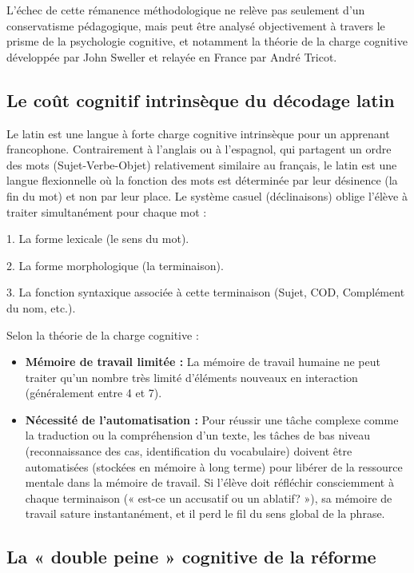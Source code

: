 L'échec de cette rémanence méthodologique ne relève pas seulement d'un conservatisme pédagogique,
mais peut être analysé objectivement à travers le prisme de la psychologie cognitive, et notamment
la théorie de la charge cognitive développée par John Sweller et relayée en France par André
Tricot.\cite{I-3-2-ref26}



\subsection{Le coût cognitif intrinsèque du décodage latin}

Le latin est une langue à forte charge cognitive intrinsèque pour un apprenant francophone.
Contrairement à l'anglais ou à l'espagnol, qui partagent un ordre des mots (Sujet-Verbe-Objet)
relativement similaire au français, le latin est une langue flexionnelle où la fonction des mots est
déterminée par leur désinence (la fin du mot) et non par leur place. Le système casuel
(déclinaisons) oblige l'élève à traiter simultanément pour chaque mot :

1. La forme lexicale (le sens du mot).

2. La forme morphologique (la terminaison).

3. La fonction syntaxique associée à cette terminaison (Sujet, COD, Complément du nom, etc.).

Selon la théorie de la charge cognitive :

\begin{itemize}\item \textbf{Mémoire de travail limitée :} La mémoire de travail humaine ne peut traiter qu'un nombre très limité d'éléments nouveaux en interaction (généralement entre 4 et 7).\item \textbf{Nécessité de l'automatisation :} Pour réussir une tâche complexe comme la traduction ou la compréhension d'un texte, les tâches de bas niveau (reconnaissance des cas, identification du vocabulaire) doivent être automatisées (stockées en mémoire à long terme) pour libérer de la ressource mentale dans la mémoire de travail.\cite{I-3-2-ref31} Si l'élève doit réfléchir consciemment à chaque terminaison (« est-ce un accusatif ou un ablatif? »), sa mémoire de travail sature instantanément, et il perd le fil du sens global de la phrase.\end{itemize}

\subsection{La « double peine » cognitive de la réforme}

